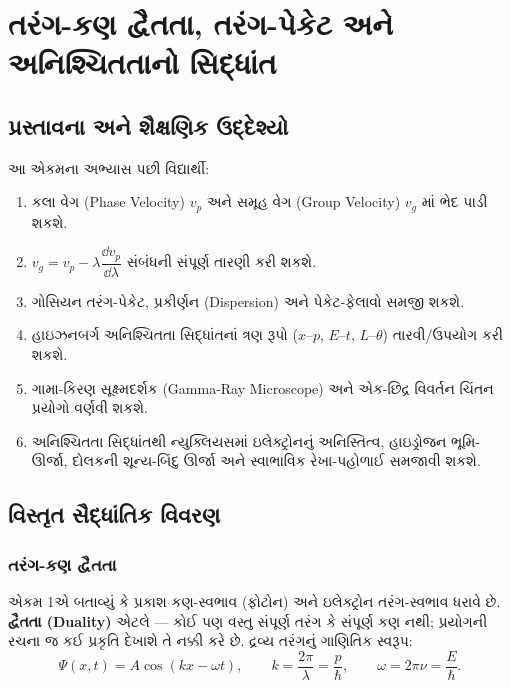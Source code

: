 \chapter[એકમ 2 : દ્વૈતતા, તરંગ-પેકેટ અને અનિશ્ચિતતા]{તરંગ-કણ દ્વૈતતા, તરંગ-પેકેટ અને અનિશ્ચિતતાનો સિદ્ધાંત }

\section{પ્રસ્તાવના અને શૈક્ષણિક ઉદ્દેશ્યો}
\begin{uddeshyo}
આ એકમના અભ્યાસ પછી વિદ્યાર્થી:
\begin{enumerate}[label=\textbf{(\arabic*)}]
  \item કલા વેગ (Phase Velocity) $v_p$ અને સમૂહ વેગ (Group Velocity) $v_g$ માં ભેદ પાડી શકશે.
  \item $v_g=v_p-\lambda\dfrac{\dd v_p}{\dd\lambda}$ સંબંધની સંપૂર્ણ તારણી કરી શકશે.
  \item ગોસિયન તરંગ-પેકેટ, પ્રકીર્ણન (Dispersion) અને પેકેટ-ફેલાવો સમજી શકશે.
  \item હાઇઝનબર્ગ અનિશ્ચિતતા સિદ્ધાંતનાં ત્રણ રૂપો ($x$--$p$, $E$--$t$, $L$--$\theta$) તારવી/ઉપયોગ કરી શકશે.
  \item ગામા-કિરણ સૂક્ષ્મદર્શક (Gamma-Ray Microscope) અને એક-છિદ્ર વિવર્તન ચિંતન પ્રયોગો વર્ણવી શકશે.
  \item અનિશ્ચિતતા સિદ્ધાંતથી ન્યુક્લિયસમાં ઇલેક્ટ્રોનનું અનિસ્તિત્વ, હાઇડ્રોજન ભૂમિ-ઊર્જા, દોલકની શૂન્ય-બિંદુ ઊર્જા અને સ્વાભાવિક રેખા-પહોળાઈ સમજાવી શકશે.
\end{enumerate}
\end{uddeshyo}

\section{વિસ્તૃત સૈદ્ધાંતિક વિવરણ}

\subsection{તરંગ-કણ દ્વૈતતા }
એકમ 1એ બતાવ્યું કે પ્રકાશ કણ-સ્વભાવ (ફોટોન) અને ઇલેક્ટ્રોન તરંગ-સ્વભાવ ધરાવે છે. \textbf{દ્વૈતતા (Duality)} એટલે — કોઈ પણ વસ્તુ સંપૂર્ણ તરંગ કે સંપૂર્ણ કણ નથી; પ્રયોગની રચના જ કઈ પ્રકૃતિ દેખાશે તે નક્કી કરે છે. દ્રવ્ય તરંગનું ગાણિતિક સ્વરૂપ:
\begin{equation}
\Psi(x,t)=A\cos(kx-\omega t),\qquad k=\frac{2\pi}{\lambda}=\frac{p}{\hbar},\qquad \omega=2\pi\nu=\frac{E}{\hbar}.
\end{equation}

